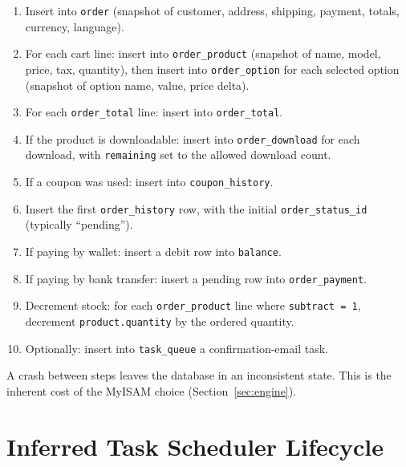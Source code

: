 \documentclass[11pt,a4paper]{article}
\begin{document}
\begin{enumerate}[leftmargin=1.6em,itemsep=2pt]
  \item Insert into \texttt{order} (snapshot of customer, address,
        shipping, payment, totals, currency, language).
  \item For each cart line: insert into \texttt{order\_product}
        (snapshot of name, model, price, tax, quantity), then
        insert into \texttt{order\_option} for each selected
        option (snapshot of option name, value, price delta).
  \item For each \texttt{order\_total} line: insert into
        \texttt{order\_total}.
  \item If the product is downloadable: insert into
        \texttt{order\_download} for each download, with
        \texttt{remaining} set to the allowed download count.
  \item If a coupon was used: insert into \texttt{coupon\_history}.
  \item Insert the first \texttt{order\_history} row, with the
        initial \texttt{order\_status\_id} (typically ``pending'').
  \item If paying by wallet: insert a debit row into
        \texttt{balance}.
  \item If paying by bank transfer: insert a pending row into
        \texttt{order\_payment}.
  \item Decrement stock: for each \texttt{order\_product} line
        where \texttt{subtract = 1}, decrement
        \texttt{product.quantity} by the ordered quantity.
  \item Optionally: insert into \texttt{task\_queue} a
        confirmation-email task.
\end{enumerate}

A crash between steps leaves the database in an inconsistent
state. This is the inherent cost of the MyISAM choice
(Section~\ref{sec:engine}).

\section{Inferred Task Scheduler Lifecycle}\label{sec:cron}
\end{document}

